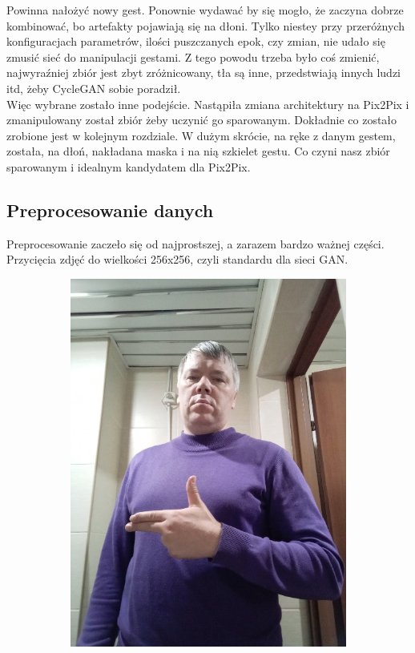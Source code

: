 \documentclass[12pt]{article}
\begin{document}
\begin{sloppypar}
{{    Powinna nałożyć nowy gest. Ponownie wydawać by się mogło, że zaczyna dobrze kombinować, bo artefakty pojawiają się na dłoni. 
    Tylko niestey przy przeróżnych konfiguracjach parametrów, ilości puszczanych epok, czy zmian, nie udało się zmusić sieć do manipulacji gestami.
    Z tego powodu trzeba było coś zmienić, najwyraźniej zbiór jest zbyt zróżnicowany, tła są inne, przedstwiają innych ludzi itd, żeby CycleGAN sobie poradził. \\
    Więc wybrane zostało inne podejście. Nastąpiła zmiana architektury na Pix2Pix i zmanipulowany został zbiór żeby uczynić go sparowanym. 
    Dokładnie co zostało zrobione jest w kolejnym rozdziale. W dużym skrócie, na ręke z danym gestem, została, na dłoń, nakładana maska i na nią szkielet gestu.
    Co czyni nasz zbiór sparowanym i idealnym kandydatem dla Pix2Pix.
  }
  \subsection{Preprocesowanie danych} \label{preprocesowanie}
  {
    Preprocesowanie zaczeło się od najprostszej, a zarazem bardzo ważnej części. Przycięcia zdjęć do wielkości 256x256, czyli standardu dla sieci GAN.
    \begin{figure}
      \begin{subfigure}{.5\textwidth}
        \centering
        \includegraphics[width=.8\linewidth]{orig.jpg}

\end{subfigure}
\end{figure}}}
\end{sloppypar}
\end{document}
